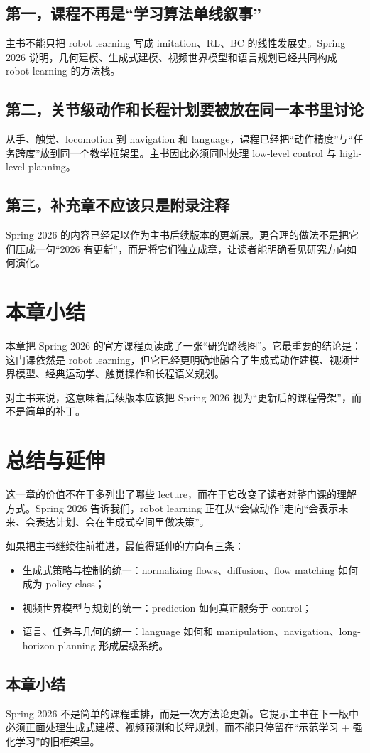 \documentclass[a4paper]{article}
\begin{document}
\subsection{第一，课程不再是“学习算法单线叙事”}

主书不能只把 robot learning 写成 imitation、RL、BC 的线性发展史。Spring 2026 说明，几何建模、生成式建模、视频世界模型和语言规划已经共同构成 robot learning 的方法栈。

\subsection{第二，关节级动作和长程计划要被放在同一本书里讨论}

从手、触觉、locomotion 到 navigation 和 language，课程已经把“动作精度”与“任务跨度”放到同一个教学框架里。主书因此必须同时处理 low-level control 与 high-level planning。

\subsection{第三，补充章不应该只是附录注释}

Spring 2026 的内容已经足以作为主书后续版本的更新层。更合理的做法不是把它们压成一句“2026 有更新”，而是将它们独立成章，让读者能明确看见研究方向如何演化。

\section{本章小结}

本章把 Spring 2026 的官方课程页读成了一张“研究路线图”。它最重要的结论是：这门课依然是 robot learning，但它已经更明确地融合了生成式动作建模、视频世界模型、经典运动学、触觉操作和长程语义规划。

对主书来说，这意味着后续版本应该把 Spring 2026 视为“更新后的课程骨架”，而不是简单的补丁。

\section{总结与延伸}

这一章的价值不在于多列出了哪些 lecture，而在于它改变了读者对整门课的理解方式。Spring 2026 告诉我们，robot learning 正在从“会做动作”走向“会表示未来、会表达计划、会在生成式空间里做决策”。

如果把主书继续往前推进，最值得延伸的方向有三条：
\begin{itemize}
  \item 生成式策略与控制的统一：normalizing flows、diffusion、flow matching 如何成为 policy class；
  \item 视频世界模型与规划的统一：prediction 如何真正服务于 control；
  \item 语言、任务与几何的统一：language 如何和 manipulation、navigation、long-horizon planning 形成层级系统。
\end{itemize}

\subsection{本章小结}

Spring 2026 不是简单的课程重排，而是一次方法论更新。它提示主书在下一版中必须正面处理生成式建模、视频预测和长程规划，而不能只停留在“示范学习 + 强化学习”的旧框架里。
\end{document}
